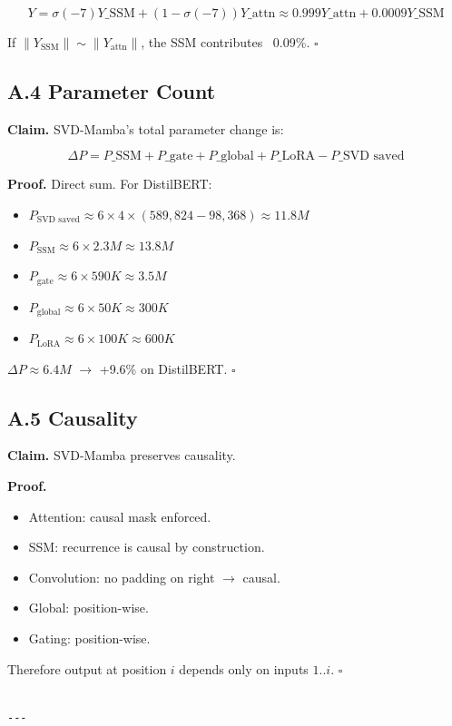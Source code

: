 \[
Y = \sigma(-7) Y\_\text{SSM} + (1 - \sigma(-7)) Y\_\text{attn} \approx 0.999 Y\_\text{attn} + 0.0009 Y\_\text{SSM}
\]

If $\|Y_\text{SSM}\| \sim \|Y_\text{attn}\|$, the SSM contributes ~0.09\%. $\square$

\subsection{A.4 Parameter Count}

\textbf{Claim.} SVD-Mamba's total parameter change is:

\[
\Delta P = P\_\text{SSM} + P\_\text{gate} + P\_\text{global} + P\_\text{LoRA} - P\_\text{SVD saved}
\tag{A.2}
\]

\textbf{Proof.} Direct sum. For DistilBERT:

\begin{itemize}
\item $P_\text{SVD saved} \approx 6 \times 4 \times (589,824 - 98,368) \approx 11.8M$
\item $P_\text{SSM} \approx 6 \times 2.3M \approx 13.8M$
\item $P_\text{gate} \approx 6 \times 590K \approx 3.5M$
\item $P_\text{global} \approx 6 \times 50K \approx 300K$
\item $P_\text{LoRA} \approx 6 \times 100K \approx 600K$

\end{itemize}
$\Delta P \approx 6.4M$ $\to$ +9.6\% on DistilBERT. $\square$

\subsection{A.5 Causality}

\textbf{Claim.} SVD-Mamba preserves causality.

\textbf{Proof.} 
\begin{itemize}
\item Attention: causal mask enforced.
\item SSM: recurrence is causal by construction.
\item Convolution: no padding on right $\to$ causal.
\item Global: position-wise.
\item Gating: position-wise.

\end{itemize}
Therefore output at position $i$ depends only on inputs $1..i$. $\square$
\begin{lstlisting}

---
\end{lstlisting}